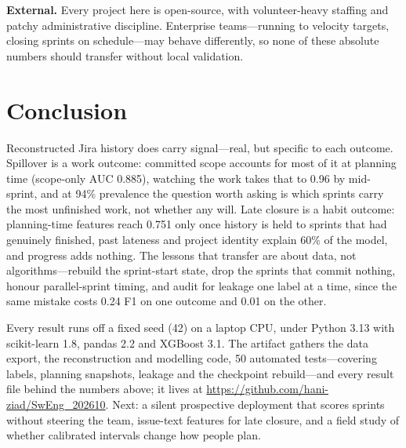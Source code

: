 \documentclass[conference]{IEEEtran}
\begin{document}
\textbf{External.} Every project here is open-source, with volunteer-heavy staffing and patchy administrative discipline. Enterprise teams---running to velocity targets, closing sprints on schedule---may behave differently, so none of these absolute numbers should transfer without local validation.

\balance

\section{Conclusion}

Reconstructed Jira history does carry signal---real, but specific to each outcome. Spillover is a work outcome: committed scope accounts for most of it at planning time (scope-only AUC 0.885), watching the work takes that to 0.96 by mid-sprint, and at 94\% prevalence the question worth asking is which sprints carry the most unfinished work, not whether any will. Late closure is a habit outcome: planning-time features reach 0.751 only once history is held to sprints that had genuinely finished, past lateness and project identity explain 60\% of the model, and progress adds nothing. The lessons that transfer are about data, not algorithms---rebuild the sprint-start state, drop the sprints that commit nothing, honour parallel-sprint timing, and audit for leakage one label at a time, since the same mistake costs 0.24 F1 on one outcome and 0.01 on the other.

Every result runs off a fixed seed (42) on a laptop CPU, under Python 3.13 with scikit-learn 1.8, pandas 2.2 and XGBoost 3.1. The artifact gathers the data export, the reconstruction and modelling code, 50 automated tests---covering labels, planning snapshots, leakage and the checkpoint rebuild---and every result file behind the numbers above; it lives at \url{https://github.com/hani-ziad/SwEng_202610}. Next: a silent prospective deployment that scores sprints without steering the team, issue-text features for late closure, and a field study of whether calibrated intervals change how people plan.
\end{document}
